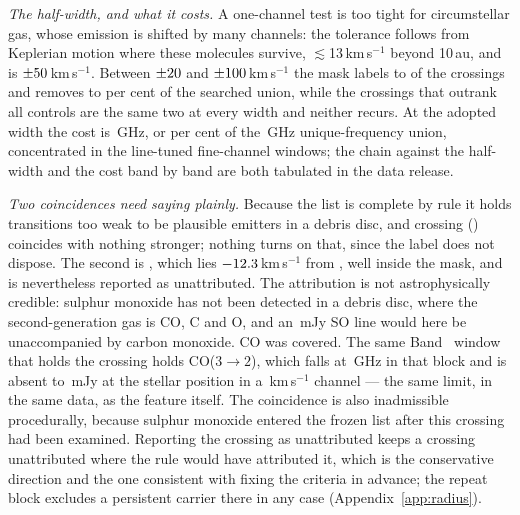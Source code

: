 \emph{The half-width, and what it costs.}
A one-channel test is too tight for circumstellar gas, whose emission is
shifted by many channels: the tolerance follows from Keplerian motion where
these molecules survive, $\lesssim$13\,km\,s$^{-1}$ beyond 10\,au, and is
$\pm50$\,km\,s$^{-1}$. Between $\pm20$ and
$\pm100$\,km\,s$^{-1}$ the mask labels \FrAttrWTwenty{} to
\FrAttrWHundred{} of the \NCross{} crossings and removes \FrMaskPctLo{} to
\FrMaskPctHi{} per cent of the searched union, while the \FrNRankPass{}
crossings that outrank all \NCtrl{} controls are the same two at every width
and neither recurs. At the adopted width the cost is \FrMaskLostGHz\,GHz, or
\FrMaskPct{} per cent of the \FrMaskUnionGHz\,GHz unique-frequency union,
concentrated in the line-tuned fine-channel windows; the chain against the
half-width and the cost band by band are both tabulated in the data release.

\begin{table}
\centering
\scriptsize
\caption{The line mask, every transition it holds. $n$ counts the hyperfine
components of one transition. Values are CDMS, except the hydrogen
recombination lines, which carry no $E_{\rm u}$ (K).}
\label{tab:masklines}

\end{table}

\emph{Two coincidences need saying plainly.} Because the list is complete by
rule it holds transitions too weak to be plausible emitters in a debris disc,
and \FrWeakOnlyN{} crossing (\FrWeakOnlyStar) coincides with nothing stronger;
nothing turns on that, since the label does not dispose. The second is
\FrCpStar, which lies $-12.3$\,km\,s$^{-1}$ from \FrSOName, well inside the
mask, and is nevertheless reported as unattributed. The attribution is not
astrophysically credible: sulphur monoxide has not been detected in a debris
disc, where the second-generation gas is CO, C and O, and an \RcCpFlux\,mJy SO
line would here be unaccompanied by carbon monoxide. CO was covered. The same
Band~\FrCpCoBand{} window that holds the crossing holds CO($3\to2$), which
falls at \FrCpCoGHz\,GHz in that block and is absent to \FrCpCoLimMJy\,mJy at
the stellar position in a \FrCpCoChanKms\,km\,s$^{-1}$ channel --- the same
limit, in the same data, as the feature itself. The coincidence is also
inadmissible procedurally, because sulphur monoxide entered the frozen list
after this crossing had been examined. Reporting the crossing as unattributed
keeps a crossing unattributed where the rule would have attributed it,
which is the conservative
direction and the one consistent with fixing the criteria in advance; the
repeat block excludes a persistent carrier there in any case
(Appendix~\ref{app:radius}).

